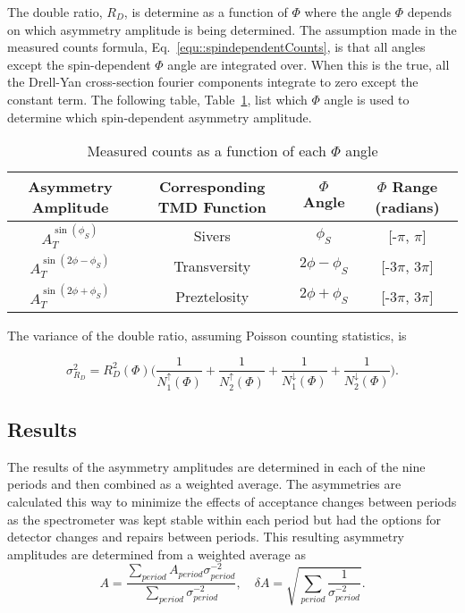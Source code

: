 The double ratio, $R_D$, is determine as a function of $\Phi$ where the angle
$\Phi$ depends on which asymmetry amplitude is being determined.  The assumption
made in the measured counts formula, Eq.~\ref{equ::spindependentCounts}, is that
all angles except the spin-dependent $\Phi$ angle are integrated over.  When
this is the true, all the Drell-Yan cross-section fourier components integrate
to zero except the constant term.  The following table,
Table~\ref{tab::ratio_phiAngles}, list which $\Phi$ angle is used to determine
which spin-dependent asymmetry amplitude.

\begin{table}[h!t]
  \centering
  \caption{Measured counts as a function of each $\Phi$ angle}
  \begin{tabular}{ |c|c|c|c| }
    \hline \textbf{Asymmetry Amplitude}& \textbf{Corresponding TMD Function}&
    \textbf{$\Phi$ Angle}& \textbf{$\Phi$ Range (radians)} \\ \hline
    
    $A^{\sin(\phi_S)}_T$& Sivers& $\phi_S$& [-$\pi$, $\pi$] \\ \hline

    $A^{\sin(2\phi-\phi_S)}_T$& Transversity& $2\phi-\phi_S$& [-3$\pi$, 3$\pi$]
    \\ \hline

    $A^{\sin(2\phi+\phi_S)}_T$& Preztelosity& $2\phi+\phi_S$& [-3$\pi$, 3$\pi$]
    \\ \hline
  \end{tabular}
    \label{tab::ratio_phiAngles}
\end{table}

The variance of the double ratio, assuming Poisson counting statistics, is

\begin{equation}
  \sigma^2_{R_D} = R^2_D(\Phi)\Big(\frac{1}{N_1^\uparrow(\Phi)}
    + \frac{1}{N_2^\uparrow(\Phi)}
    + \frac{1}{N_1^\downarrow(\Phi)}
    +\frac{1}{N_2^\downarrow(\Phi)}
   \Big).
\end{equation}

\subsection{Results}\label{sec::doubleratio_results}
The results of the asymmetry amplitudes are determined in each of the nine
periods and then combined as a weighted average.  The asymmetries are calculated
this way to minimize the effects of acceptance changes between periods as the
spectrometer was kept stable within each period but had the options for detector
changes and repairs between periods.  This resulting asymmetry amplitudes are
determined from a weighted average as
\begin{equation}
  \label{equ::wAvg}
  A = \frac{
    \sum_{period}
  A_{period}\sigma^{-2}_{period}
  }{
    \sum_{period} \sigma^{-2}_{period}
    },
  \quad \delta A = \sqrt{\sum_{period}
  \frac{1}{\sigma^{-2}_{period}}}.
\end{equation}

